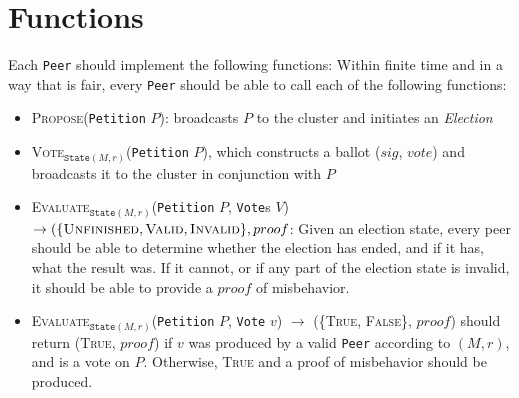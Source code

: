 \section{Functions}
Each \texttt{Peer} should implement the following functions:
Within finite time and in a way that is fair, every \texttt{Peer} should be able
to call each of the following functions:
\begin{itemize}
  \item \textsc{Propose}(\texttt{Petition} $P$): broadcasts $P$ to the cluster
    and initiates an \emph{Election}
  \item \textsc{Vote}$_{\texttt{State} (M, r)}$(\texttt{Petition} $P$), which
    constructs a ballot ($sig$, $vote$) and broadcasts it to the cluster in
    conjunction with $P$
  \item \textsc{Evaluate}$_{\texttt{State} (M,r)}$(\texttt{Petition} $P$,
    \texttt{Vote}s $V$) $\to (\{\textsc{Unfinished}, \textsc{Valid},
    \textsc{Invalid}\}, proof$: Given an election state, every peer
    should be able to determine whether the election has ended, and if it has,
    what the result was. If it cannot, or if any part of the election state is
    invalid, it should be able to provide a $proof$ of misbehavior.
  \item \textsc{Evaluate}$_{\texttt{State} (M,r)}$(\texttt{Petition}
    $P$, \texttt{Vote} $v$) $\to$ (\{\textsc{True, False}\}, $proof$) should
    return (\textsc{True}, $proof$) if $v$ was produced by a valid \texttt{Peer}
    according to $(M,r)$, and is a vote on $P$. Otherwise, \textsc{True} and a
    proof of misbehavior should be produced.
\end{itemize}


